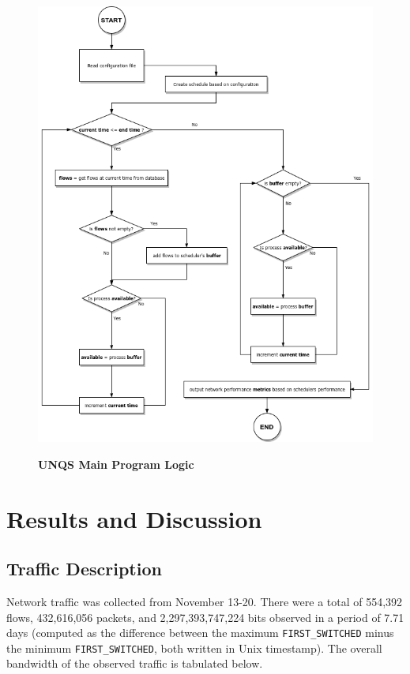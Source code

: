 \documentclass[journal]{IEEE/IEEEtran}
\begin{document}
\begin{figure}
\includegraphics[width=\textwidth]{UNQS_FlowChart}
\label{fig:flowchart}\caption{\textbf{UNQS Main Program Logic}}
\end{figure}

\section{Results and Discussion}

\subsection{Traffic Description}

Network traffic was collected from November 13-20. There were a total of 554,392 flows, 432,616,056 packets, and 2,297,393,747,224 bits observed in a period of 7.71 days (computed as the difference between the maximum \texttt{FIRST\_SWITCHED} minus the minimum \texttt{FIRST\_SWITCHED}, both written in Unix timestamp). The overall bandwidth of the observed traffic is tabulated below.
\end{document}
